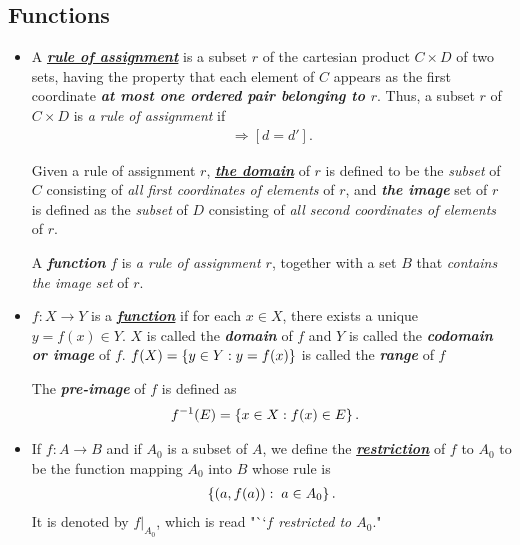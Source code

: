 \documentclass[11pt]{article}
\begin{document}
\subsection{Functions}
\begin{itemize}
\item \begin{definition}
A \underline{\emph{\textbf{rule of assignment}}} is a subset $r$ of the cartesian product $C \times D$ of two sets, having the property that each element of $C$ appears as the first coordinate  \emph{\textbf{at most one ordered pair belonging to $r$}}. Thus, a subset $r$ of $C \times D$ is \emph{a rule of assignment} if
\begin{align*}
[(c, d) \in r\text{ and }(c, d') \in r] \Rightarrow [d = d'].
\end{align*}

Given a rule of assignment $r$, \underline{\emph{\textbf{the domain}}} of $r$ is defined to be the \emph{subset} of $C$ consisting of \emph{all first coordinates of elements} of $r$, and \emph{\textbf{the image}} set of $r$ is defined as the \emph{subset} of $D$ consisting of \emph{all second coordinates of elements} of $r$.

A \emph{\textbf{function}} $f$ is \emph{a rule of assignment $r$}, together with a set $B$ that \emph{contains the image set} of $r$.
\end{definition}

\item \begin{definition} 
$f: X\rightarrow Y$ is a \underline{\emph{\textbf{function}}} if for each $x \in X$, there exists a unique $y = f(x) \in Y$. $X$ is called the \emph{\textbf{domain}} of $f$ and $Y$ is called the  \emph{\textbf{codomain or image}} of $f$. $f(X) = \left\{y \in Y: y = f(x)\right\}$ is called the \emph{\textbf{range}} of $f$

The \emph{\textbf{pre-image}} of $f$ is defined as
\begin{align*}
f^{-1}(E) &= \left\{x \in X: f(x) \in E\right\}.
\end{align*}
\end{definition}

\item \begin{definition}
If $f: A \rightarrow B$ and if $A_0$ is a subset of $A$, we define the \underline{\emph{\textbf{restriction}}} of $f$ to $A_0$ to be the function mapping $A_0$ into $B$ whose rule is
\begin{align*}
\left\{(a, f(a)): \; a\in A_0\right\}.
\end{align*}
It is denoted by $f|_{A_0}$, which is read "``\emph{$f$ restricted to $A_0$}."
\end{definition}


\end{itemize}
\end{document}
